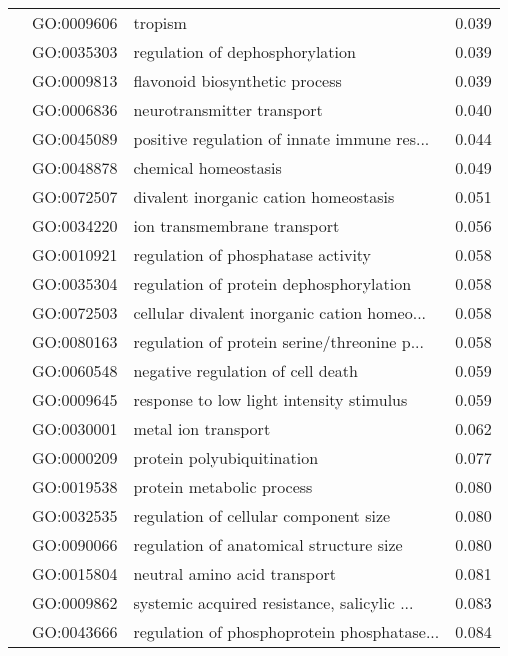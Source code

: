\begin{longtable}{lllr}
   & GO:0009606 &                                      tropism &         0.039 \\
   & GO:0035303 &              regulation of dephosphorylation &         0.039 \\
   & GO:0009813 &               flavonoid biosynthetic process &         0.039 \\
   & GO:0006836 &                   neurotransmitter transport &         0.040 \\
   & GO:0045089 &  positive regulation of innate immune res... &         0.044 \\
   & GO:0048878 &                         chemical homeostasis &         0.049 \\
   & GO:0072507 &        divalent inorganic cation homeostasis &         0.051 \\
   & GO:0034220 &                  ion transmembrane transport &         0.056 \\
   & GO:0010921 &           regulation of phosphatase activity &         0.058 \\
   & GO:0035304 &      regulation of protein dephosphorylation &         0.058 \\
   & GO:0072503 &  cellular divalent inorganic cation homeo... &         0.058 \\
   & GO:0080163 &  regulation of protein serine/threonine p... &         0.058 \\
   & GO:0060548 &            negative regulation of cell death &         0.059 \\
   & GO:0009645 &     response to low light intensity stimulus &         0.059 \\
   & GO:0030001 &                          metal ion transport &         0.062 \\
   & GO:0000209 &                   protein polyubiquitination &         0.077 \\
   & GO:0019538 &                    protein metabolic process &         0.080 \\
   & GO:0032535 &        regulation of cellular component size &         0.080 \\
   & GO:0090066 &      regulation of anatomical structure size &         0.080 \\
   & GO:0015804 &                 neutral amino acid transport &         0.081 \\
   & GO:0009862 &  systemic acquired resistance, salicylic ... &         0.083 \\
   & GO:0043666 &  regulation of phosphoprotein phosphatase... &         0.084 \\

\end{longtable}
